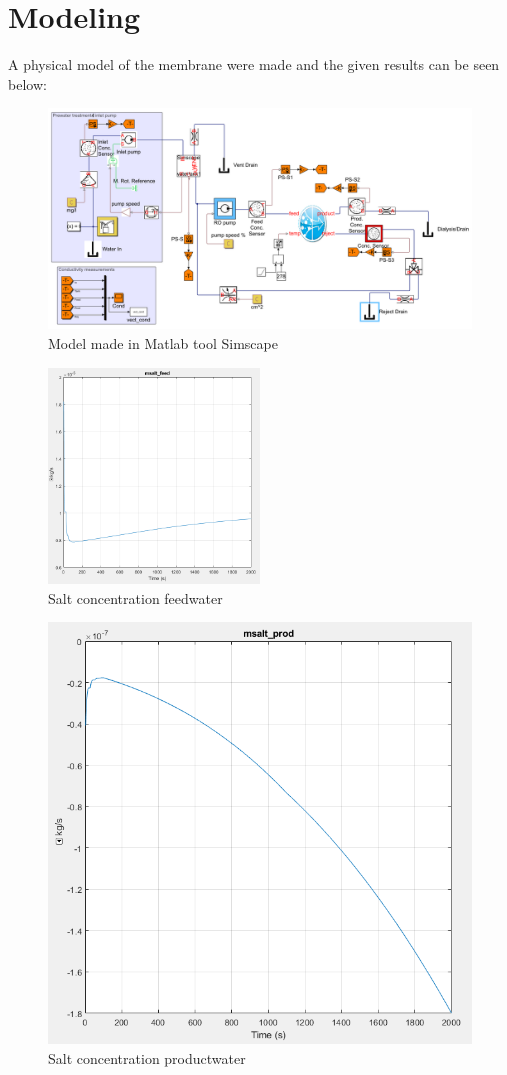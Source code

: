 \section{Modeling}
A physical model of the membrane were made and the given results can be seen below:

\begin{figure}[h]
\centering
\includegraphics[width=\textwidth]{simscape_fc1.PNG}
\caption{Model made in Matlab tool Simscape}
\label{fig:simscape}
\end{figure}

\begin{figure}[h]
\centering
    \includegraphics[width=0.5\textwidth]{msalt_feed.PNG}
    \caption{Salt concentration feedwater}
    \label{fig:msaltf}
\end{figure}

\begin{figure}[h]
\centering
  \includegraphics[width=0.5\linewidth]{msalt_prod.PNG}
  \caption{Salt concentration productwater}
  \label{fig:msalp}
\end{figure}

